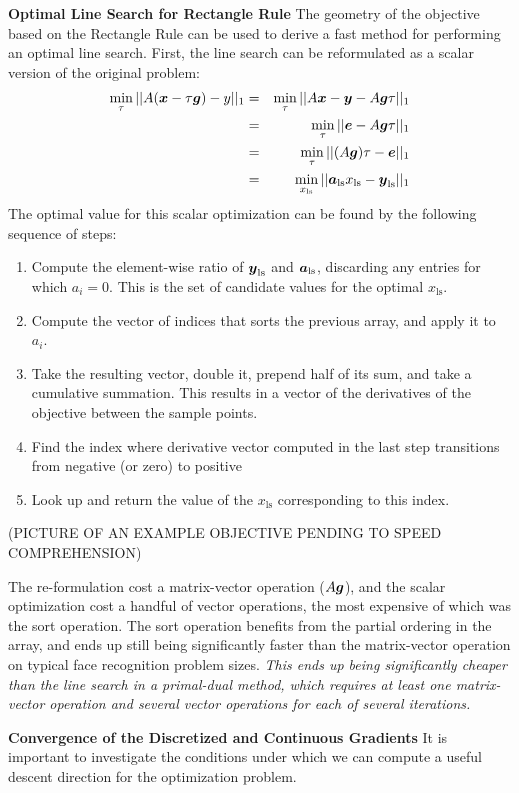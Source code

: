 \documentclass[12pt,journal,draftcls,letterpaper,onecolumn]{IEEEtran}
\begin{document}
{\bf Optimal Line Search for Rectangle Rule} The geometry of the objective based on the Rectangle Rule can be used to derive a fast method for performing an optimal line search.  First, the line search can be reformulated as a scalar version of the original problem:
\begin{eqnarray*}
\min_{\tau}{||A ({\boldsymbol{x}} - \tau \boldsymbol{g})-y||_1} &=& \min_{\tau} ||A{\boldsymbol{x}} - {\boldsymbol{y}} - A \boldsymbol{g} \tau||_1 \\
&=& \min_{\tau} ||\boldsymbol{e} - A \boldsymbol{g} \tau||_1 \\
&=& \min_{\tau} ||(A\boldsymbol{g}) \tau - \boldsymbol{e}||_1 \\
&=& \min_{x_{\textrm{ls}}} ||\boldsymbol{a}_{\textrm{ls}} x_{\textrm{ls}} - {\boldsymbol{y}}_{\textrm{ls}}||_1
\end{eqnarray*}
The optimal value for this scalar optimization can be found by the following sequence of steps:
\begin{enumerate}
\item Compute the element-wise ratio of ${\boldsymbol{y}}_{\textrm{ls}}$ and $\boldsymbol{a}_{\textrm{ls}}$, discarding any entries for which $a_i = 0$.  This is the set of candidate values for the optimal $x_{\textrm{ls}}$.
\item Compute the vector of indices that sorts the previous array, and apply it to $a_i$.
\item Take the resulting vector, double it, prepend half of its sum, and take a cumulative summation.  This results in a vector of the derivatives of the objective between the sample points. 
\item Find the index where derivative vector computed in the last step transitions from negative (or zero) to positive
\item Look up and return the value of the $x_{\textrm{ls}}$ corresponding to this index.
\end{enumerate}
(PICTURE OF AN EXAMPLE OBJECTIVE PENDING TO SPEED COMPREHENSION)

The re-formulation cost a matrix-vector operation ($A\boldsymbol{g}$), and the scalar optimization cost a handful of vector operations, the most expensive of which was the sort operation.  The sort operation benefits from the partial ordering in the array, and ends up still being significantly faster than the matrix-vector operation on typical face recognition problem sizes. {\em This ends up being significantly cheaper than the line search in a primal-dual method, which requires at least one matrix-vector operation and several vector operations for each of several iterations. }

{\bf Convergence of the Discretized and Continuous Gradients } It is important to investigate the conditions under which we can compute a useful descent direction for the optimization problem.  
\end{document}
